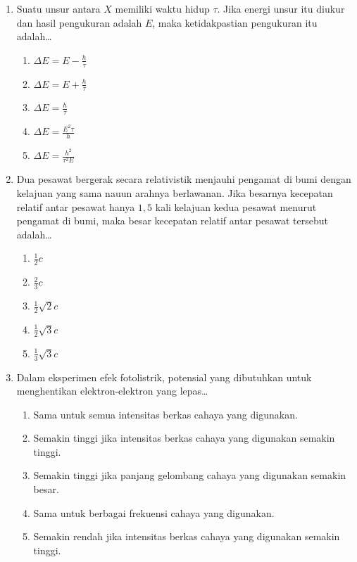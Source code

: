 \documentclass[A4,12PT, english, twocolumn]{journal}
\begin{document}
\begin{enumerate}
\item Suatu unsur antara $X$ memiliki waktu hidup $\tau$. Jika energi unsur itu diukur dan hasil pengukuran adalah $E$, maka ketidakpastian pengukuran itu adalah\dots
    \begin{enumerate}
        \item $\Delta E = E - \frac{h}{\tau}$
        \item $\Delta E = E + \frac{h}{\tau}$
        \item $\Delta E = \frac{h}{\tau}$
        \item $\Delta E = \frac{E^2 \tau}{h}$
        \item $\Delta E = \frac{h^2}{\tau^2 E}$
    \end{enumerate}

\item Dua pesawat bergerak secara relativistik menjauhi pengamat di bumi dengan kelajuan yang sama nauun arahnya berlawanan. Jika besarnya kecepatan relatif antar pesawat hanya $1,5$ kali kelajuan kedua pesawat menurut pengamat di bumi, maka besar kecepatan relatif antar pesawat tersebut adalah\dots
    \begin{enumerate}
        \item $\frac{1}{2}c$
        \item $\frac{2}{3}c$
        \item $\frac{1}{2}\sqrt{2}c$
        \item $\frac{1}{2}\sqrt{3}c$
        \item $\frac{1}{3}\sqrt{3}c$
    \end{enumerate}

\item Dalam eksperimen efek fotolistrik, potensial yang dibutuhkan untuk menghentikan elektron-elektron yang lepas\dots
    \begin{enumerate}
        \item Sama untuk semua intensitas berkas cahaya yang digunakan.
        \item Semakin tinggi jika intensitas berkas cahaya yang digunakan semakin tinggi.
        \item Semakin tinggi jika panjang gelombang cahaya yang digunakan semakin besar.
        \item Sama untuk berbagai frekuensi cahaya yang digunakan.
        \item Semakin rendah jika intensitas berkas cahaya yang digunakan semakin tinggi.
    \end{enumerate}


\end{enumerate}
\end{document}
